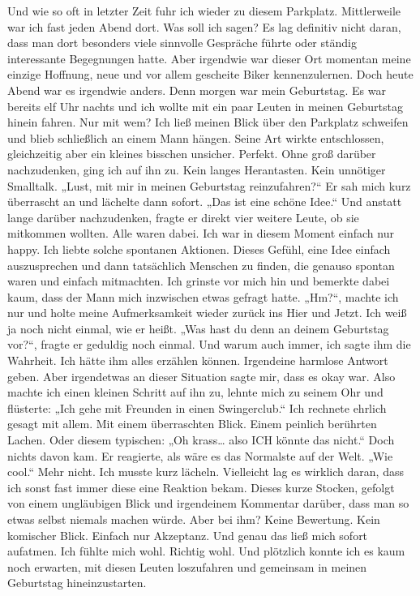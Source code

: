 Und wie so oft in letzter Zeit fuhr ich wieder zu diesem Parkplatz.
Mittlerweile war ich fast jeden Abend dort.
Was soll ich sagen? Es lag definitiv nicht daran, dass man dort besonders viele sinnvolle Gespräche führte oder ständig interessante Begegnungen hatte. Aber irgendwie war dieser Ort momentan meine einzige Hoffnung, neue und vor allem gescheite Biker kennenzulernen.
Doch heute Abend war es irgendwie anders.
Denn morgen war mein Geburtstag.
Es war bereits elf Uhr nachts und ich wollte mit ein paar Leuten in meinen Geburtstag hinein fahren.
Nur mit wem?
Ich ließ meinen Blick über den Parkplatz schweifen und blieb schließlich an einem Mann hängen. Seine Art wirkte entschlossen, gleichzeitig aber ein kleines bisschen unsicher.
Perfekt.
Ohne groß darüber nachzudenken, ging ich auf ihn zu.
Kein langes Herantasten. Kein unnötiger Smalltalk.
„Lust, mit mir in meinen Geburtstag reinzufahren?“
Er sah mich kurz überrascht an und lächelte dann sofort.
„Das ist eine schöne Idee.“
Und anstatt lange darüber nachzudenken, fragte er direkt vier weitere Leute, ob sie mitkommen wollten.
Alle waren dabei.
Ich war in diesem Moment einfach nur happy.
Ich liebte solche spontanen Aktionen. Dieses Gefühl, eine Idee einfach auszusprechen und dann tatsächlich Menschen zu finden, die genauso spontan waren und einfach mitmachten.
Ich grinste vor mich hin und bemerkte dabei kaum, dass der Mann mich inzwischen etwas gefragt hatte.
„Hm?“, machte ich nur und holte meine Aufmerksamkeit wieder zurück ins Hier und Jetzt.
Ich weiß ja noch nicht einmal, wie er heißt.
„Was hast du denn an deinem Geburtstag vor?“, fragte er geduldig noch einmal.
Und warum auch immer, ich sagte ihm die Wahrheit.
Ich hätte ihm alles erzählen können.
Irgendeine harmlose Antwort geben.
Aber irgendetwas an dieser Situation sagte mir, dass es okay war.
Also machte ich einen kleinen Schritt auf ihn zu, lehnte mich zu seinem Ohr und flüsterte:
„Ich gehe mit Freunden in einen Swingerclub.“
Ich rechnete ehrlich gesagt mit allem.
Mit einem überraschten Blick.
Einem peinlich berührten Lachen.
Oder diesem typischen:
„Oh krass… also ICH könnte das nicht.“
Doch nichts davon kam.
Er reagierte, als wäre es das Normalste auf der Welt.
„Wie cool.“
Mehr nicht.
Ich musste kurz lächeln.
Vielleicht lag es wirklich daran, dass ich sonst fast immer diese eine Reaktion bekam. Dieses kurze Stocken, gefolgt von einem ungläubigen Blick und irgendeinem Kommentar darüber, dass man so etwas selbst niemals machen würde.
Aber bei ihm?
Keine Bewertung.
Kein komischer Blick.
Einfach nur Akzeptanz.
Und genau das ließ mich sofort aufatmen.
Ich fühlte mich wohl.
Richtig wohl.
Und plötzlich konnte ich es kaum noch erwarten, mit diesen Leuten loszufahren und gemeinsam in meinen Geburtstag hineinzustarten.

